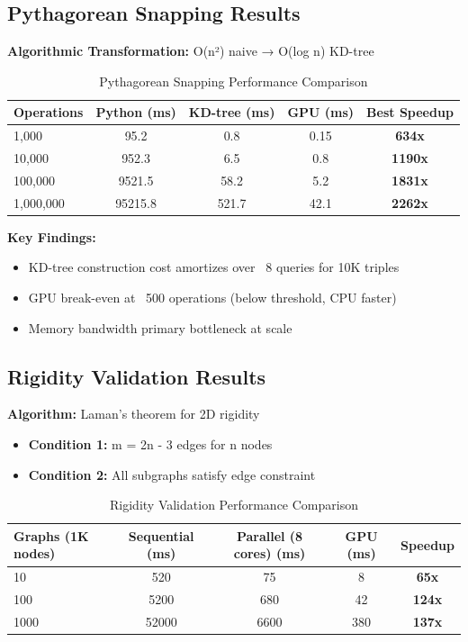 \documentclass{article}
\begin{document}
\subsection{Pythagorean Snapping Results}

\textbf{Algorithmic Transformation:} O(n²) naive → O(log n) KD-tree

\begin{table}[h]
\centering
\begin{tabular}{lcccc}
\toprule
Operations & Python (ms) & KD-tree (ms) & GPU (ms) & Best Speedup \\
\midrule
1,000 & 95.2 & 0.8 & 0.15 & \textbf{634x} \\
10,000 & 952.3 & 6.5 & 0.8 & \textbf{1190x} \\
100,000 & 9521.5 & 58.2 & 5.2 & \textbf{1831x} \\
1,000,000 & 95215.8 & 521.7 & 42.1 & \textbf{2262x} \\
\bottomrule
\end{tabular}
\caption{Pythagorean Snapping Performance Comparison}
\end{table}

\textbf{Key Findings:}
\begin{itemize}
    \item KD-tree construction cost amortizes over ~8 queries for 10K triples
    \item GPU break-even at ~500 operations (below threshold, CPU faster)
    \item Memory bandwidth primary bottleneck at scale
\end{itemize}

\subsection{Rigidity Validation Results}

\textbf{Algorithm:} Laman's theorem for 2D rigidity
\begin{itemize}
    \item \textbf{Condition 1:} m = 2n - 3 edges for n nodes
    \item \textbf{Condition 2:} All subgraphs satisfy edge constraint
\end{itemize}

\begin{table}[h]
\centering
\begin{tabular}{lcccc}
\toprule
Graphs (1K nodes) & Sequential (ms) & Parallel (8 cores) (ms) & GPU (ms) & Speedup \\
\midrule
10 & 520 & 75 & 8 & \textbf{65x} \\
100 & 5200 & 680 & 42 & \textbf{124x} \\
1000 & 52000 & 6600 & 380 & \textbf{137x} \\
\bottomrule
\end{tabular}
\caption{Rigidity Validation Performance Comparison}
\end{table}
\end{document}
